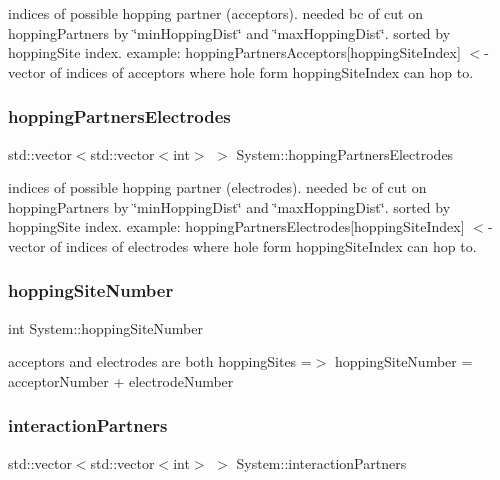 indices of possible hopping partner (acceptors). needed bc of cut on hopping\+Partners by \char`\"{}min\+Hopping\+Dist\char`\"{} and \char`\"{}max\+Hopping\+Dist\char`\"{}. sorted by hopping\+Site index. example\+: hopping\+Partners\+Acceptors\mbox{[}hopping\+Site\+Index\mbox{]} $<$-\/ vector of indices of acceptors where hole form hopping\+Site\+Index can hop to. \mbox{\label{classSystem_a777232d4fec6f13fc7423a477f629a0f}} 
\subsubsection{\texorpdfstring{hopping\+Partners\+Electrodes}{hoppingPartnersElectrodes}}
{\footnotesize\ttfamily std\+::vector$<$std\+::vector$<$int$>$ $>$ System\+::hopping\+Partners\+Electrodes\hspace{0.3cm}{\ttfamily [private]}}

indices of possible hopping partner (electrodes). needed bc of cut on hopping\+Partners by \char`\"{}min\+Hopping\+Dist\char`\"{} and \char`\"{}max\+Hopping\+Dist\char`\"{}. sorted by hopping\+Site index. example\+: hopping\+Partners\+Electrodes\mbox{[}hopping\+Site\+Index\mbox{]} $<$-\/ vector of indices of electrodes where hole form hopping\+Site\+Index can hop to. \mbox{\label{classSystem_abace9493421abf20f1ae9502963a9b5d}} 
\subsubsection{\texorpdfstring{hopping\+Site\+Number}{hoppingSiteNumber}}
{\footnotesize\ttfamily int System\+::hopping\+Site\+Number\hspace{0.3cm}{\ttfamily [private]}}

acceptors and electrodes are both hopping\+Sites =$>$ hopping\+Site\+Number = acceptor\+Number + electrode\+Number \mbox{\label{classSystem_a7938c9208ca6b86c4d1629418aabd98f}} 
\subsubsection{\texorpdfstring{interaction\+Partners}{interactionPartners}}
{\footnotesize\ttfamily std\+::vector$<$std\+::vector$<$int$>$ $>$ System\+::interaction\+Partners\hspace{0.3cm}{\ttfamily [private]}}

